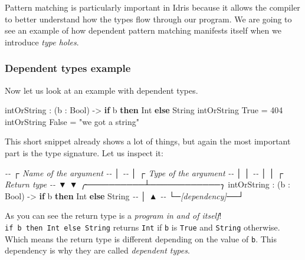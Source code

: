 \documentclass[
]{article}
\newenvironment{Shaded}{}{}
\newcommand{\CommentTok}[1]{\textcolor[rgb]{0.38,0.63,0.69}{\textit{#1}}}
\newcommand{\DataTypeTok}[1]{\textcolor[rgb]{0.56,0.13,0.00}{#1}}
\newcommand{\DecValTok}[1]{\textcolor[rgb]{0.25,0.63,0.44}{#1}}
\newcommand{\KeywordTok}[1]{\textcolor[rgb]{0.00,0.44,0.13}{\textbf{#1}}}
\newcommand{\NormalTok}[1]{#1}
\newcommand{\OperatorTok}[1]{\textcolor[rgb]{0.40,0.40,0.40}{#1}}
\newcommand{\OtherTok}[1]{\textcolor[rgb]{0.00,0.44,0.13}{#1}}
\newcommand{\StringTok}[1]{\textcolor[rgb]{0.25,0.44,0.63}{#1}}
\begin{document}
Pattern matching is particularly important in Idris because it allows
the compiler to better understand how the types flow through our
program. We are going to see an example of how dependent pattern
matching\cite{view_from_the_left} manifests itself when we introduce
\emph{type holes}.

\hypertarget{dependent-types-example}{%
\subsubsection{Dependent types example}\label{dependent-types-example}}

Now let us look at an example with dependent types.

\begin{Shaded}
\begin{Highlighting}[]
\NormalTok{intOrString }\OperatorTok{:}\NormalTok{ (b }\OperatorTok{:} \DataTypeTok{Bool}\NormalTok{) }\OtherTok{{-}\textgreater{}} \KeywordTok{if}\NormalTok{ b }\KeywordTok{then} \DataTypeTok{Int} \KeywordTok{else} \DataTypeTok{String}
\NormalTok{intOrString }\DataTypeTok{True} \OtherTok{=} \DecValTok{404}
\NormalTok{intOrString }\DataTypeTok{False} \OtherTok{=} \StringTok{"we got a string"}
\end{Highlighting}
\end{Shaded}

This short snippet already shows a lot of things, but again the most
important part is the type signature. Let us inspect it:

\begin{Shaded}
\begin{Highlighting}[]
\CommentTok{{-}{-}             ┌ Name of the argument}
\CommentTok{{-}{-}             │}
\CommentTok{{-}{-}             │    ┌ Type of the argument  }
\CommentTok{{-}{-}             │    │ }
\CommentTok{{-}{-}             │    │                  ┌ Return type}
\CommentTok{{-}{-}             ▼    ▼       ╭──────────┴────────────╮  }
\NormalTok{intOrString }\OperatorTok{:}\NormalTok{ (b }\OperatorTok{:} \DataTypeTok{Bool}\NormalTok{) }\OtherTok{{-}\textgreater{}} \KeywordTok{if}\NormalTok{ b }\KeywordTok{then} \DataTypeTok{Int} \KeywordTok{else} \DataTypeTok{String}
\CommentTok{{-}{-}             │               ▲}
\CommentTok{{-}{-}             └─[dependency]──┘}
\end{Highlighting}
\end{Shaded}

As you can see the return type is a \emph{program in and of itself}!
\texttt{if\ b\ then\ Int\ else\ String} returns \texttt{Int} if
\texttt{b} is \texttt{True} and \texttt{String} otherwise. Which means
the return type is different depending on the value of \texttt{b}. This
dependency is why they are called \emph{dependent types}.
\end{document}
